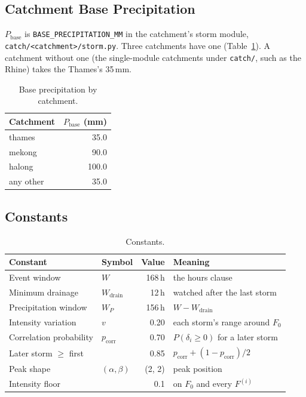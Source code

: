 \documentclass[11pt,a4paper]{article}
\begin{document}
\subsection{Catchment Base Precipitation}
$P_{\text{base}}$ is \texttt{BASE\_PRECIPITATION\_MM} in the catchment's storm module,
\texttt{catch/<catchment>/storm.py}. Three catchments have one (Table~\ref{tab:pbase}). A
catchment without one (the single-module catchments under \texttt{catch/}, such as the
Rhine) takes the Thames's 35\,mm.
\begin{table}[H]
\centering\small
\caption{Base precipitation by catchment.}\label{tab:pbase}
\begin{tabular}{lr}
\toprule
Catchment & $P_{\text{base}}$ (mm) \\
\midrule
thames & 35.0 \\ mekong & 90.0 \\ halong & 100.0 \\
any other & 35.0 \\
\bottomrule
\end{tabular}
\end{table}

\subsection{Constants}
\begin{table}[H]
\centering\small
\caption{Constants.}\label{tab:const}
\begin{tabular}{llrl}
\toprule
Constant & Symbol & Value & Meaning \\
\midrule
Event window & $W$ & 168\,h & the hours clause \\
Minimum drainage & $W_{\text{drain}}$ & 12\,h & watched after the last storm \\
Precipitation window & $W_P$ & 156\,h & $W - W_{\text{drain}}$ \\
Intensity variation & $v$ & 0.20 & each storm's range around $F_0$ \\
Correlation probability & $p_{\text{corr}}$ & 0.70 & $P(\delta_i \ge 0)$ for a later storm \\
Later storm $\ge$ first & & 0.85 & $p_{\text{corr}} + (1-p_{\text{corr}})/2$ \\
Peak shape & $(\alpha,\beta)$ & (2, 2) & peak position \\
Intensity floor & & 0.1 & on $F_0$ and every $F^{(i)}$ \\
\bottomrule
\end{tabular}
\end{table}
\end{document}
